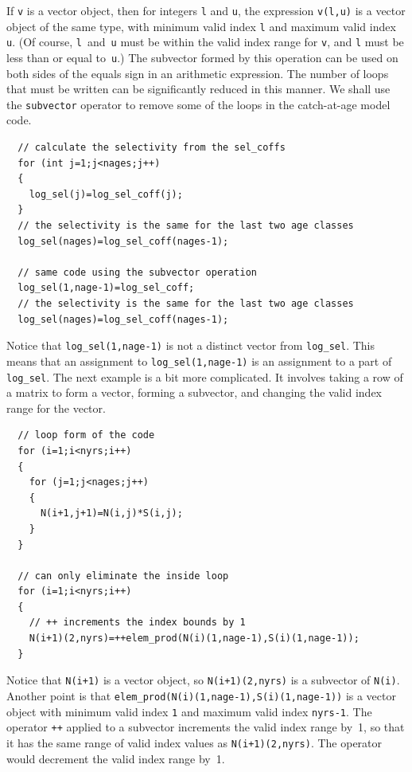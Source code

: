 \documentclass{admbmanual}
\begin{document}
If \texttt{v} is a vector object, then for integers \texttt{l} and \texttt{u},
the expression \texttt{v(l,u)} is a vector object of the same type,
with minimum valid index \texttt{l} and maximum valid index \texttt{u}.
(Of course, \texttt{l}~and~\texttt{u} must be within the valid index range for
\texttt{v}, and \texttt{l} must be less than or equal to~\texttt{u}.)
The subvector formed by this operation can be used on both sides of
the equals sign in an arithmetic expression. The  number of loops that must be
written can be significantly reduced in this manner. We shall use the \texttt{subvector}
operator to remove some of the loops in the catch-at-age model code.
\begin{lstlisting}
  // calculate the selectivity from the sel_coffs
  for (int j=1;j<nages;j++)
  {
    log_sel(j)=log_sel_coff(j);
  }
  // the selectivity is the same for the last two age classes
  log_sel(nages)=log_sel_coff(nages-1);

  // same code using the subvector operation
  log_sel(1,nage-1)=log_sel_coff;
  // the selectivity is the same for the last two age classes
  log_sel(nages)=log_sel_coff(nages-1);
\end{lstlisting}
Notice that \texttt{log\_sel(1,nage-1)} is not a distinct vector
from  \texttt{log\_sel}. This means that an assignment to \texttt{log\_sel(1,nage-1)}
is an assignment to a part of \texttt{log\_sel}.
The next example is a bit more complicated. It involves taking a row of a matrix
to form a vector, forming a subvector, and changing the valid index range
for the vector.
\begin{lstlisting}
  // loop form of the code
  for (i=1;i<nyrs;i++)
  {
    for (j=1;j<nages;j++)
    {
      N(i+1,j+1)=N(i,j)*S(i,j);
    }
  }

  // can only eliminate the inside loop
  for (i=1;i<nyrs;i++)
  {
    // ++ increments the index bounds by 1
    N(i+1)(2,nyrs)=++elem_prod(N(i)(1,nage-1),S(i)(1,nage-1));
  }
\end{lstlisting}
Notice that \texttt{N(i+1)} is a vector object, so
\texttt{N(i+1)(2,nyrs)} is a subvector of \texttt{N(i)}. Another
point is that \texttt{elem\_prod(N(i)(1,nage-1),S(i)(1,nage-1))}
is a vector object with minimum valid index \texttt{1} and maximum valid
index \texttt{nyrs-1}. The operator \texttt{++} applied to a subvector
increments the valid index range by~1, so that it has the same
range of valid index values as \texttt{N(i+1)(2,nyrs)}.
The operator  would decrement the valid index range by~1.
\end{document}
